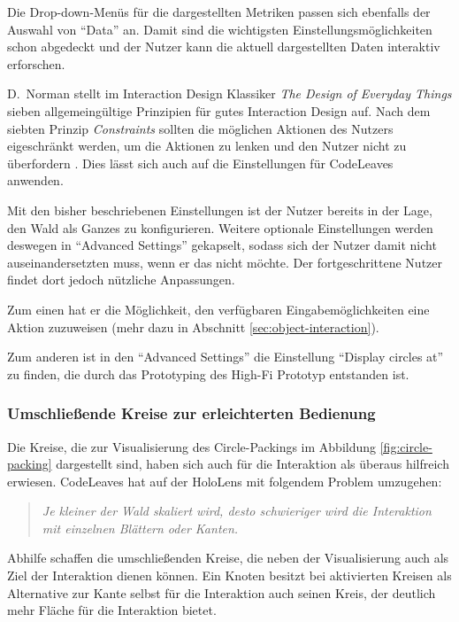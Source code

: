 Die Drop-down-Menüs für die dargestellten Metriken passen sich ebenfalls der Auswahl von "`Data"' an. Damit sind die wichtigsten Einstellungsmöglichkeiten schon abgedeckt und der Nutzer kann die aktuell dargestellten Daten interaktiv erforschen.

D.\ Norman stellt im Interaction Design Klassiker \textit{The Design of Everyday Things} sieben allgemeingültige Prinzipien für gutes Interaction Design auf. Nach dem siebten Prinzip \textit{Constraints} sollten die möglichen Aktionen des Nutzers eigeschränkt werden, um die Aktionen zu lenken und den Nutzer nicht zu überfordern \cite{norman2013design}. Dies lässt sich auch auf die Einstellungen für CodeLeaves anwenden.

Mit den bisher beschriebenen Einstellungen ist der Nutzer bereits in der Lage, den Wald als Ganzes zu konfigurieren. Weitere optionale Einstellungen werden deswegen in "`Advanced Settings"' gekapselt, sodass sich der Nutzer damit nicht auseinandersetzten muss, wenn er das nicht möchte. Der fortgeschrittene Nutzer findet dort jedoch nützliche Anpassungen.

Zum einen hat er die Möglichkeit, den verfügbaren Eingabemöglichkeiten eine Aktion zuzuweisen (mehr dazu in Abschnitt \ref{sec:object-interaction}).

Zum anderen ist in den "`Advanced Settings"' die Einstellung "`Display circles at"' zu finden, die durch das Prototyping des High-Fi Prototyp entstanden ist.

\subsubsection*{Umschließende Kreise zur erleichterten Bedienung}
Die Kreise, die zur Visualisierung des Circle-Packings im Abbildung \ref{fig:circle-packing} dargestellt sind, haben sich auch für die Interaktion als überaus hilfreich erwiesen. CodeLeaves hat auf der HoloLens mit folgendem Problem umzugehen:

\begin{quote}
  \textit{Je kleiner der Wald skaliert wird, desto schwieriger wird die Interaktion mit einzelnen Blättern oder Kanten.}
\end{quote}

Abhilfe schaffen die umschließenden Kreise, die neben der Visualisierung auch als Ziel der Interaktion dienen können. Ein Knoten besitzt bei aktivierten Kreisen als Alternative zur Kante selbst für die Interaktion auch seinen Kreis, der deutlich mehr Fläche für die Interaktion bietet.

